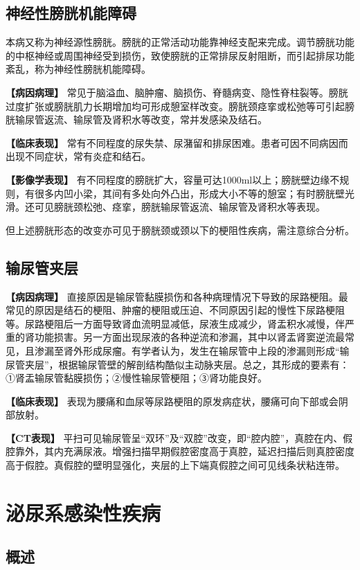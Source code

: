 \subsection{神经性膀胱机能障碍}

本病又称为神经源性膀胱。膀胱的正常活动功能靠神经支配来完成。调节膀胱功能的中枢神经或周围神经受到损伤，致使膀胱的正常排尿反射阻断，而引起排尿功能紊乱，称为神经性膀胱机能障碍。

\textbf{【病因病理】}
常见于脑溢血、脑肿瘤、脑损伤、脊髓病变、隐性脊柱裂等。膀胱过度扩张或膀胱肌力长期增加均可形成憩室样改变。膀胱颈痉挛或松弛等可引起膀胱输尿管返流、输尿管及肾积水等改变，常并发感染及结石。

\textbf{【临床表现】}
常有不同程度的尿失禁、尿潴留和排尿困难。患者可因不同病因而出现不同症状，常有炎症和结石。

\textbf{【影像学表现】}
有不同程度的膀胱扩大，容量可达1000ml以上；膀胱壁边缘不规则，有很多内凹小梁，其间有多处向外凸出，形成大小不等的憩室；有时膀胱壁光滑。还可见膀胱颈松弛、痉挛，膀胱输尿管返流、输尿管及肾积水等表现。

但上述膀胱形态的改变亦可见于膀胱颈或颈以下的梗阻性疾病，需注意综合分析。

\subsection{输尿管夹层}

\textbf{【病因病理】}
直接原因是输尿管黏膜损伤和各种病理情况下导致的尿路梗阻。最常见的原因是结石的梗阻、肿瘤的梗阻或压迫、不同原因引起的慢性下尿路梗阻等。尿路梗阻后一方面导致肾血流明显减低，尿液生成减少，肾盂积水减慢，伴严重的肾功能损害。另一方面出现尿液的各种逆流和渗漏，其中以肾盂肾窦逆流最常见，且渗漏至肾外形成尿瘤。有学者认为，发生在输尿管中上段的渗漏则形成“输尿管夹层”，根据输尿管壁的解剖结构酷似主动脉夹层。总之，其形成的要素有：①肾盂输尿管黏膜损伤；②慢性输尿管梗阻；③肾功能良好。

\textbf{【临床表现】}
表现为腰痛和血尿等尿路梗阻的原发病症状，腰痛可向下部或会阴部放射。

\textbf{【CT表现】}
平扫可见输尿管呈“双环”及“双腔”改变，即“腔内腔”，真腔在内、假腔靠外，其内充满尿液。增强扫描早期假腔密度高于真腔，延迟扫描后则真腔密度高于假腔。真假腔的壁明显强化，夹层的上下端真假腔之间可见线条状粘连带。

\section{泌尿系感染性疾病}

\subsection{概述}

